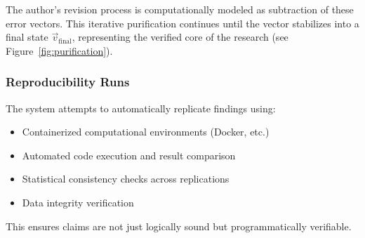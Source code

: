 \documentclass[11pt,a4paper]{article}
\begin{document}
\begin{small}
The author's revision process is computationally modeled as subtraction of these error vectors. This iterative purification continues until the vector stabilizes into a final state $\vec{v}_{\text{final}}$, representing the verified core of the research (see Figure~\ref{fig:purification}).

\subsubsection{Reproducibility Runs}
The system attempts to automatically replicate findings using:
\begin{itemize}[nosep]
    \item Containerized computational environments (Docker, etc.)
    \item Automated code execution and result comparison
    \item Statistical consistency checks across replications
    \item Data integrity verification
\end{itemize}

\noindent This ensures claims are not just logically sound but programmatically verifiable.

\begin{figure}[h!]
\centering
{}
\end{figure}
\end{small}
\end{document}
